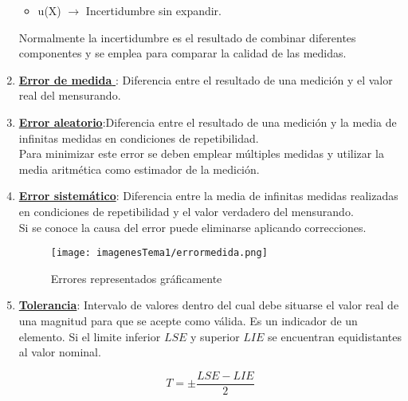 \begin{enumerate}
\begin{itemize}
		\item u(X) $\rightarrow$ Incertidumbre sin expandir.
	\end{itemize} 
	
	Normalmente la incertidumbre es el resultado de combinar diferentes componentes y se emplea para comparar la calidad de las medidas.
	\item \underline{\textbf{Error de medida }}: Diferencia entre el resultado de una	medición y el valor real del mensurando.
	\item \underline{\textbf{Error aleatorio}}:Diferencia entre el resultado de una medición y la media de infinitas medidas en condiciones de repetibilidad.
	\\
	Para minimizar este error se deben emplear múltiples medidas y utilizar la media aritmética como estimador de la medición.
	\item \underline{\textbf{Error sistemático}}: Diferencia entre la media de infinitas medidas realizadas en condiciones de repetibilidad y el valor verdadero del mensurando.
	\\
	Si se conoce la causa del error puede eliminarse aplicando correcciones.
	
	\begin{figure} [H]
		\centering
		\texttt{[image: imagenesTema1/errormedida.png]}  
		\caption{Errores representados gráficamente}
		\label{fig:sample}
	\end{figure}
	\item \underline{\textbf{Tolerancia}}: Intervalo de valores dentro del cual debe situarse el valor real de una magnitud para que se acepte como válida. Es un indicador de un elemento.
	Si el limite inferior $LSE$ y superior $LIE$ se encuentran equidistantes al valor nominal.
	
	\[T=\pm \frac{LSE - LIE}{2}\]

\end{enumerate}

